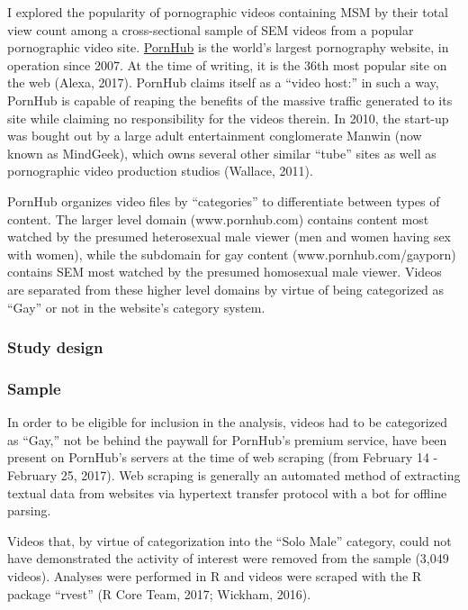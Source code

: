 \documentclass[]{article}
\begin{document}
I explored the popularity of pornographic videos containing MSM by their
total view count among a cross-sectional sample of SEM videos from a
popular pornographic video site. \href{www.pornhub.com}{PornHub} is the
world's largest pornography website, in operation since 2007. At the
time of writing, it is the 36th most popular site on the web (Alexa,
2017). PornHub claims itself as a ``video host:'' in such a way, PornHub
is capable of reaping the benefits of the massive traffic generated to
its site while claiming no responsibility for the videos therein. In
2010, the start-up was bought out by a large adult entertainment
conglomerate Manwin (now known as MindGeek), which owns several other
similar ``tube'' sites as well as pornographic video production studios
(Wallace, 2011).

PornHub organizes video files by ``categories'' to differentiate between
types of content. The larger level domain (www.pornhub.com) contains
content most watched by the presumed heterosexual male viewer (men and
women having sex with women), while the subdomain for gay content
(www.pornhub.com/gayporn) contains SEM most watched by the presumed
homosexual male viewer. Videos are separated from these higher level
domains by virtue of being categorized as ``Gay'' or not in the
website's category system.

\subsubsection{Study design}\label{study-design}

\subsubsection{Sample}\label{sample}

In order to be eligible for inclusion in the analysis, videos had to be
categorized as ``Gay,'' not be behind the paywall for PornHub's premium
service, have been present on PornHub's servers at the time of web
scraping (from February 14 - February 25, 2017). Web scraping is
generally an automated method of extracting textual data from websites
via hypertext transfer protocol with a bot for offline parsing.

Videos that, by virtue of categorization into the ``Solo Male''
category, could not have demonstrated the activity of interest were
removed from the sample (3,049 videos). Analyses were performed in R and
videos were scraped with the R package ``rvest'' (R Core Team, 2017;
Wickham, 2016).
\end{document}
